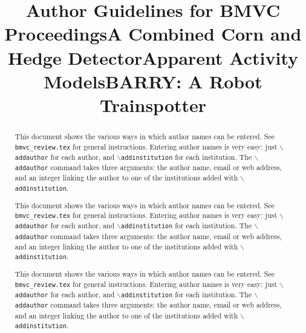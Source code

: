 \documentclass{bmvc2k}
\begin{document}
\def\cmd#1{$\backslash${\tt #1}}
\def\makeabstract{
\begin{abstract}
This document shows the various ways in which author names can be entered.
See {\tt bmvc\_review.tex} for general instructions.  Entering author names
is very easy: just \cmd{addauthor} for each author, and
\cmd{addinstitution} for each institution. The \cmd{addauthor} command
takes three arguments: the author name, email or web address, and an
integer linking the author to one of the institutions added with
\cmd{addinstitution}. 
\end{abstract}
}

\title{Author Guidelines for BMVC Proceedings}


\maketitle
\makeabstract

\bmvaResetAuthors
\title{A Combined Corn and Hedge Detector}

\maketitle
\makeabstract

\bmvaResetAuthors
\title{Apparent Activity Models}

\maketitle
\makeabstract

\bmvaResetAuthors
\title{B{\large\bfseries ARRY}: A Robot Trainspotter}
\end{document}
